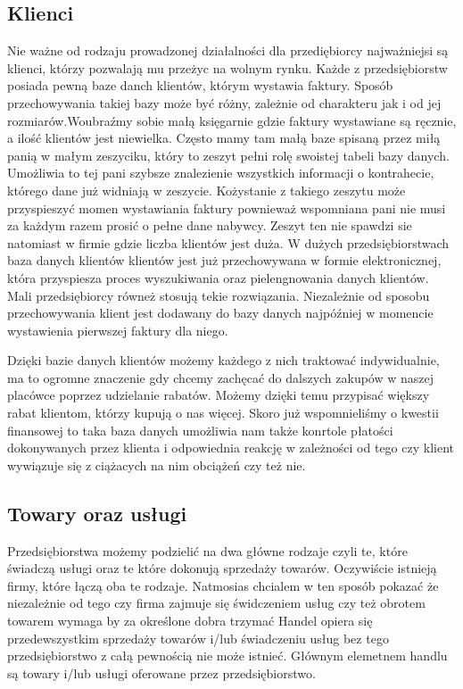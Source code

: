 \subsection{Klienci}
\label{klienci}
Nie ważne od rodzaju prowadzonej działalności dla przediębiorcy najważniejsi są
klienci, którzy pozwalają mu przeżyc na wolnym rynku. Każde z przedsiębiorstw
posiada pewną baze danch klientów, którym wystawia faktury. Sposób
przechowywania takiej bazy może być różny, zależnie od charakteru jak i od jej
rozmiarów.Woubraźmy sobie małą księgarnie gdzie faktury wystawiane są ręcznie, a
ilość klientów jest niewielka. Często mamy tam małą baze spisaną przez miłą
panią w małym zeszyciku, który to zeszyt pełni rolę swoistej tabeli bazy danych. Umożliwia to tej pani szybsze znalezienie wszystkich informacji o kontrahecie, którego dane już widniają w zeszycie. Kożystanie z takiego zeszytu może przyspieszyć momen
wystawiania faktury pownieważ wspomniana pani nie musi za każdym razem prosić o
pełne dane nabywcy. Zeszyt ten nie spawdzi sie natomiast w firmie gdzie
liczba klientów jest duża. W dużych przedsiębiorstwach baza danych klientów
klientów jest już przechowywana w formie elektronicznej, która przyspiesza
proces wyszukiwania oraz pielengnowania danych klientów. Mali przedsiębiorcy
równeż stosują tekie rozwiązania. Niezależnie od sposobu przechowywania klient
jest dodawany do bazy danych najpóźniej w momencie wystawienia pierwszej faktury
dla niego. 

Dzięki bazie danych klientów możemy każdego z nich traktować indywidualnie, ma
to ogromne znaczenie gdy chcemy zachęcać do dalszych zakupów w naszej placówce
poprzez udzielanie rabatów. Możemy dzięki temu przypisać większy rabat klientom,
którzy kupują o nas więcej. Skoro już wspomnieliśmy o kwestii finansowej to taka
baza danych umożliwia nam także konrtole płatości dokonywanych przez klienta i
odpowiednia reakcję w zależności od tego czy klient wywiązuje się z ciążacych na
nim obciążeń czy też nie.
\subsection{Towary oraz usługi}
Przedsiębiorstwa możemy podzielić na dwa główne rodzaje czyli te, które świadczą
usługi oraz te które dokonują sprzedaży towarów. Oczywiście istnieją firmy,
które łączą oba te rodzaje. Natmosias chcialem w ten sposób pokazać że
niezależnie od tego czy firma zajmuje się świdczeniem usług czy też obrotem
towarem wymaga by za określone dobra trzymać  Handel opiera się przedewszystkim
sprzedaży towarów i/lub świadczeniu usług bez tego przedsiębiorstwo z całą pewnością nie może istnieć.   Głównym elemetnem handlu są towary i/lub usługi oferowane przez przedsiębiorstwo.

